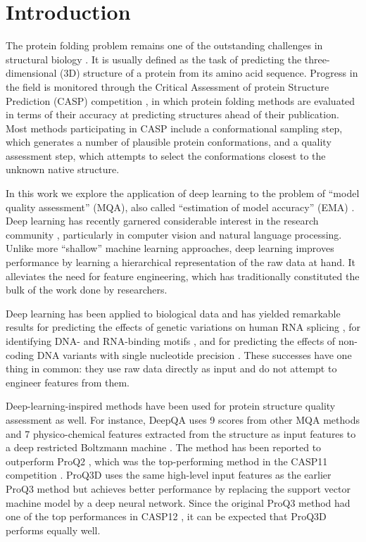 \documentclass{bioinfo}
\begin{document}
\maketitle

\section{Introduction}

The protein folding problem remains one of the outstanding challenges
in structural biology \citep{dill2012folding}.  It is usually defined
as the task of predicting the three-dimensional (3D) structure of a
protein from its amino acid sequence.
Progress in the field is monitored through the Critical Assessment of
protein Structure Prediction (CASP) competition \citep{moult1995large},
in which protein folding methods are evaluated in terms of their
accuracy at predicting structures ahead of their
publication. Most methods participating in CASP include a conformational
sampling step, which generates a number of plausible protein
conformations, and a quality assessment step, which attempts to select
the conformations closest to the unknown native structure.

In this work we explore the application of deep learning to the
problem of ``model quality assessment'' (MQA), also called
``estimation of model accuracy'' (EMA) \citep{kryshtafovych2015}. Deep
learning has recently garnered considerable interest in the
research community \citep{lecun2015deep}, particularly in computer
vision and natural language processing. Unlike more ``shallow''
machine learning approaches, deep learning improves performance by
learning a hierarchical representation of the raw data at hand. It
alleviates the need for feature engineering, which has traditionally
constituted the bulk of the work done by researchers.

Deep learning has been applied to biological data and has
yielded remarkable results for predicting the effects of genetic
variations on human RNA splicing \citep{xiong2015human}, for
identifying DNA- and RNA-binding
motifs \citep{alipanahi2015predicting}, and for predicting the effects
of non-coding DNA variants with single nucleotide
precision \citep{zhou2015predicting}. These successes have one thing in
common: they use raw data directly as input and do not attempt to
engineer features from them.

Deep-learning-inspired methods have been used for protein structure quality
assessment as well. For instance, DeepQA \citep{cao2016deepqa} uses 9
scores from other MQA methods and 7 physico-chemical features
extracted from the structure as input features to a deep restricted
Boltzmann machine \citep{hinton2006fast}. The method has been reported
to outperform ProQ2 \citep{ray2012proq2}, which was the top-performing
method in the CASP11 competition \citep{kryshtafovych2015}.  ProQ3D
\citep{uziela2017proq3d} uses the same high-level input features as
the earlier ProQ3 method \citep{uziela2016proq3} but achieves better
performance by replacing the support vector machine model by a deep
neural network. Since the original ProQ3 method had one of the top
performances in CASP12 \citep{elofsson2017qacasp12}, it can be
expected that ProQ3D performs equally well.
\end{document}
